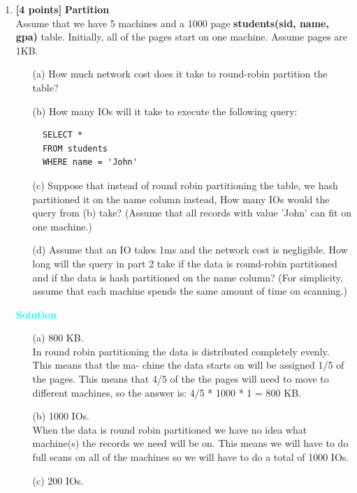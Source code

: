 \documentclass[10pt]{article}
\newenvironment{solution}
    { \begin{mdframed}[backgroundcolor=gray!10] \textcolor{cyan}{\textbf{Solution}} \\}
    {  \end{mdframed}}
\begin{document}
\begin{enumerate}

	\item \textbf{[4 points]} \textbf{Partition} \\
	      Assume that we have 5 machines and a 1000 page \textbf{students(sid, name, gpa)} table. Initially,
	      all of the pages start on one machine. Assume pages are 1KB.
	      \begin{itemize}
		      \item[(a)] How much network cost does it take to round-robin partition the table?
		      \item[(b)] How many IOs will it take to execute the following query:
		            \begin{lstlisting} 
  SELECT *
  FROM students
  WHERE name = 'John'
\end{lstlisting}
		      \item[(c)] Suppose that instead of round robin partitioning the table, we hash partitioned it on the name
		            column instead, How many IOs would the query from (b) take?
		            (Assume that all records with value 'John' can fit on one machine.)
		      \item[(d)] Assume that an IO takes 1ms and the network cost is negligible. How long will the query in part
		            2 take if the data is round-robin partitioned and if the data is hash partitioned on the name column?
		            (For simplicity, assume that each machine spends the same amount of time on scanning.)
	      \end{itemize}
	      \begin{solution}
		      \begin{itemize}
			      \item[(a)] 800 KB. \\
			            In round robin partitioning the data is distributed completely evenly. This means that the ma-
			            chine the data starts on will be assigned 1/5 of the pages. This means that 4/5 of the the pages
			            will need to move to different machines, so the answer is: 4/5 * 1000 * 1 = 800 KB.
			      \item[(b)] 1000 IOs. \\
			            When the data is round robin partitioned we have no idea what machine(s) the records we
			            need will be on. This means we will have to do full scans on all of the machines so we will have to
			            do a total of 1000 IOs.
			      \item[(c)] 200 IOs. \\

\end{itemize}
\end{solution}
\end{enumerate}
\end{document}
